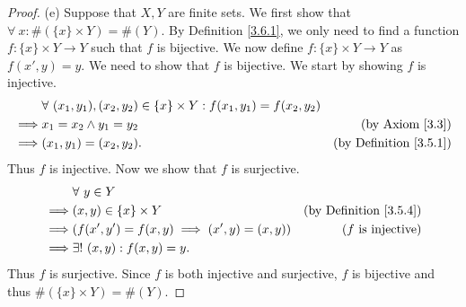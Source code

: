 \begin{proof}{(e)}
    Suppose that \(X, Y\) are finite sets.
    We first show that \(\forall\ x : \#(\{x\} \times Y) = \#(Y)\).
    By Definition \ref{3.6.1}, we only need to find a function \(f : \{x\} \times Y \to Y\) such that \(f\) is bijective.
    We now define \(f : \{x\} \times Y \to Y\) as \(f(x', y) = y\).
    We need to show that \(f\) is bijective.
    We start by showing \(f\) is injective.
    \begin{align*}
                 & \forall\ (x_1, y_1), (x_2, y_2) \in \{x\} \times Y : f(x_1, y_1) = f(x_2, y_2)                                      \\
        \implies & x_1 = x_2 \land y_1 = y_2                                                      & \text{(by Axiom \ref{3.3})}        \\
        \implies & (x_1, y_1) = (x_2, y_2).                                                       & \text{(by Definition \ref{3.5.1})}
    \end{align*}
    Thus \(f\) is injective.
    Now we show that \(f\) is surjective.
    \begin{align*}
                 & \forall\ y \in Y                                                                     \\
        \implies & (x, y) \in \{x\} \times Y                       & \text{(by Definition \ref{3.5.4})} \\
        \implies & (f(x', y') = f(x, y) \implies (x', y) = (x, y)) & \text{(\(f\) is injective)}        \\
        \implies & \exists!\ (x, y) : f(x, y) = y.
    \end{align*}
    Thus \(f\) is surjective.
    Since \(f\) is both injective and surjective, \(f\) is bijective and thus \(\#(\{x\} \times Y) = \#(Y)\).


\end{proof}
